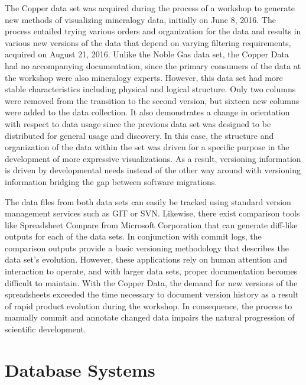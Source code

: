 The Copper data set was acquired during the process of a workshop to generate new methods of visualizing mineralogy data, initially on June 8, 2016.
The process entailed trying various orders and organization for the data and results in various new versions of the data that depend on varying filtering requirements, acquired on August 21, 2016.
Unlike the Noble Gas data set, the Copper Data had no accompanying documentation, since the primary consumers of the data at the workshop were also mineralogy experts.
However, this data set had more stable characteristics including physical and logical structure.
Only two columns were removed from the transition to the second version, but sixteen new columns were added to the data collection.
It also demonstrates a change in orientation with respect to data usage since the previous data set was designed to be distributed for general usage and discovery.
In this case, the structure and organization of the data within the set was driven for a specific purpose in the development of more expressive visualizations.
As a result, versioning information is driven by developmental needs instead of the other way around with versioning information bridging the gap between software migrations.

The data files from both data sets can easily be tracked using standard version management services such as GIT or SVN.
Likewise, there exist comparison tools like Spreadsheet Compare from Microsoft Corporation that can generate diff-like outputs for each of the data sets.
In conjunction with commit logs, the comparison outputs provide a basic versioning methodology that describes the data set's evolution.
However, these applications rely on human attention and interaction to operate, and with larger data sets, proper documentation becomes difficult to maintain.
With the Copper Data, the demand for new versions of the spreadsheets exceeded the time necessary to document version history as a result of rapid product evolution during the workshop.
In consequence, the process to manually commit and annotate changed data impairs the natural progression of scientific development.

\section{Database Systems}

